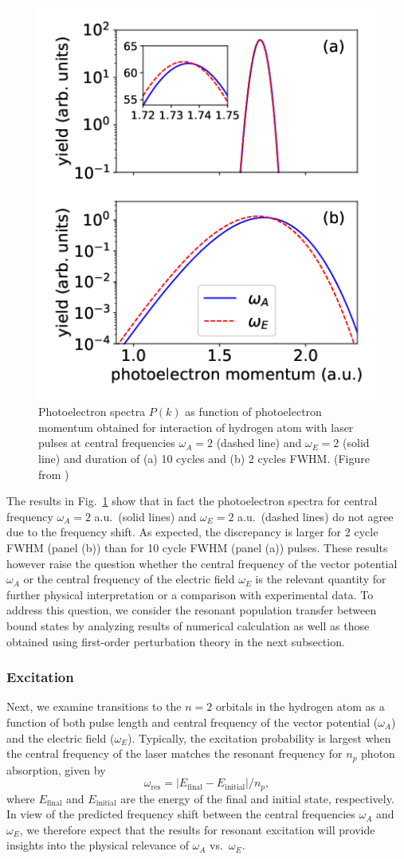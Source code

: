 \begin{figure}[!ht]
\centering
    \includegraphics[width=0.4\linewidth]{figs/Frequency_shift/single_photon_ion.png}
\caption{
Photoelectron spectra $P(k)$ as function of photoelectron momentum obtained for interaction of hydrogen atom with laser pulses at central frequencies $\omega_A=2$ (dashed line) and $\omega_E=2$ (solid line) and duration of (a) 10 cycles and (b) 2 cycles FWHM. (Figure from \cite{venzke2018_Central})
}
  \label{fig:ionizationA}
\end{figure}

The results in Fig.~\ref{fig:ionizationA} show that in fact the photoelectron spectra for central frequency $\omega_A = 2$ a.u.\  (solid lines) and $\omega_E = 2$ a.u.\  (dashed lines) do not agree due to the frequency shift. As expected, the discrepancy is larger for 2 cycle FWHM (panel (b)) than for 10 cycle FWHM (panel (a)) pulses. These results however raise the question whether the central frequency of the vector potential $\omega_A$ or the central frequency of the electric field $\omega_E$ is the relevant quantity for further physical interpretation or a comparison with experimental data. To address this question, we consider the resonant population transfer between bound states by analyzing results of numerical calculation as well as those obtained using first-order perturbation theory in the next subsection.

\subsubsection{Excitation}
\label{sec:excitation}

Next, we examine transitions to the $n=2$ orbitals in the hydrogen atom as a function of both pulse length and central frequency of the vector potential ($\omega_A$) and the electric field ($\omega_E$).
Typically, the excitation probability is largest when the central frequency of the laser matches the resonant frequency for $n_p$ photon absorption, given by
\begin{equation}
\omega_{\text{res}} = |E_\text{final} - E_\text{initial}|/n_p,
\end{equation}
where $E_\text{final}$ and $E_\text{initial}$ are the energy of the final and initial state, respectively. In view of the predicted frequency shift between the central frequencies $\omega_A$ and $\omega_E$, we therefore expect that the results for resonant excitation will provide insights into the physical relevance of $\omega_A$ vs.~$\omega_E$.

